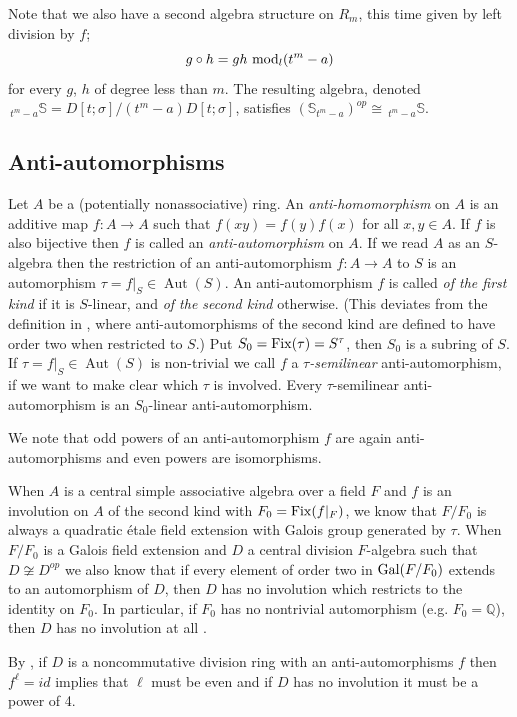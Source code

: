 \documentclass{amsart}
\theoremstyle{plain}
\theoremstyle{definition}
\numberwithin{equation}{section}
\numberwithin{figure}{section}
\DeclareMathOperator{\Aut}{Aut}
\begin{document}
 Note that we also have a second algebra structure on $R_m$, this time given by left division by $f$;
 $$g\circ h=gh \,\,{\rm mod}_l (t^m-a) $$
 for every $g$, $h$ of degree less than $m$. The resulting algebra, denoted $ \,_{t^m-a} \mathbb{S}=D[t;\sigma]/(t^m-a)D[t;\sigma]$, satisfies
 $( \mathbb{S}_{t^m-a})^{op}\cong \,_{t^m-a} \mathbb{S}$. 
  


\subsection{Anti-automorphisms} Let $A$ be a (potentially nonassociative) ring. An \emph{anti-homomorphism} on $A$ is an additive map $f:A\to A$ such that
$f(xy)=f(y)f(x)$ for all $x,y\in A$. If $f$ is also bijective then $f$ is called an  \emph{anti-automorphism} on $A$. If we read $A$ as  an $S$-algebra then the restriction of an anti-automorphism $f:A\to A$  to $S$ is an automorphism $\tau=f|_S\in \Aut(S)$. An anti-automorphism $f$ is called \emph{of the first kind} if it is $S$-linear, and \emph{of the second kind} otherwise. (This deviates from the definition in
 \cite[p.~254]{Lewis}, where anti-automorphisms of the second kind are defined to have order two when restricted to $S$.)
 Put $S_0={\rm Fix}(\tau)=S^\tau$, then $S_0$ is a subring of $S$.
 If $\tau=f|_S\in \Aut (S)$ is non-trivial  we call $f$ a \emph{$\tau$-semilinear } anti-automorphism, if we want to make clear which $\tau$ is involved. Every $\tau$-semilinear anti-automorphism is an $S_0$-linear anti-automorphism.

We note that odd powers of an anti-automorphism  $f$ are again anti-automorphisms and even powers are isomorphisms.


When $A$ is a central simple associative algebra over a field $F$  and $f$ is an involution on $A$ of the second kind with $F_0={\rm Fix}(f|_F)$, we know that $F/F_0$ is always a quadratic \'etale  field extension with Galois group generated by $\tau$.  When $F/F_0 $ is a Galois field extension and $D$  a central division
$F$-algebra such that $D \not\cong D^{op}$ we also know that if every element of order two in ${\rm Gal}(F/F_0)$ extends to
an automorphism of $D$, then $D$ has no involution which restricts to the identity on
$F_0$. In particular, if $F_0$ has no nontrivial automorphism (e.g. $F_0 = \mathbb{Q}$), then $D$ has
no involution at all \cite[Proposition 3.2.]{MST}.

By \cite[Lemma 3.1]{MST}, if $D$ is a noncommutative division ring with an anti-automorphisms $f$ then $f^\ell=id$ implies that $\ell$ must be even and if $D$ has no involution it must be a power of 4.
\end{document}
